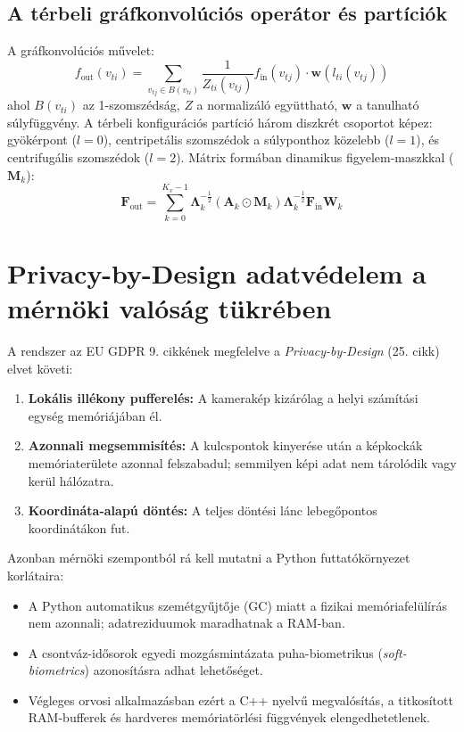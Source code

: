 \documentclass[12pt,a4paper,oneside]{report}
\begin{document}
\subsection{A térbeli gráfkonvolúciós operátor és partíciók}
A gráfkonvolúciós művelet:
\begin{equation}
    f_{\text{out}}(v_{ti}) = \sum_{v_{tj} \in B(v_{ti})} \frac{1}{Z_{ti}(v_{tj})} f_{\text{in}}(v_{tj}) \cdot \mathbf{w}\left(l_{ti}(v_{tj})\right)
\end{equation}
ahol $B(v_{ti})$ az 1-szomszédság, $Z$ a normalizáló együttható, $\mathbf{w}$ a tanulható súlyfüggvény. A térbeli konfigurációs partíció három diszkrét csoportot képez: gyökérpont ($l=0$), centripetális szomszédok a súlyponthoz közelebb ($l=1$), és centrifugális szomszédok ($l=2$). Mátrix formában dinamikus figyelem-maszkkal ($\mathbf{M}_k$):
\begin{equation}
    \mathbf{F}_{\text{out}} = \sum_{k=0}^{K_v - 1} \mathbf{\Lambda}_k^{-\frac{1}{2}} \left( \mathbf{A}_k \odot \mathbf{M}_k \right) \mathbf{\Lambda}_k^{-\frac{1}{2}} \mathbf{F}_{\text{in}} \mathbf{W}_k
\end{equation}

\section{Privacy-by-Design adatvédelem a mérnöki valóság tükrében}
A rendszer az EU GDPR 9. cikkének \cite{gdpr2016} megfelelve a \textit{Privacy-by-Design} (25. cikk) elvet követi:
\begin{enumerate}
    \item \textbf{Lokális illékony pufferelés:} A kamerakép kizárólag a helyi számítási egység memóriájában él.
    \item \textbf{Azonnali megsemmisítés:} A kulcspontok kinyerése után a képkockák memóriaterülete azonnal felszabadul; semmilyen képi adat nem tárolódik vagy kerül hálózatra.
    \item \textbf{Koordináta-alapú döntés:} A teljes döntési lánc lebegőpontos koordinátákon fut.
\end{enumerate}

Azonban mérnöki szempontból rá kell mutatni a Python futtatókörnyezet korlátaira:
\begin{itemize}
    \item A Python automatikus szemétgyűjtője (GC) miatt a fizikai memóriafelülírás nem azonnali; adatreziduumok maradhatnak a RAM-ban.
    \item A csontváz-idősorok egyedi mozgásmintázata puha-biometrikus (\textit{soft-biometrics}) azonosításra adhat lehetőséget.
    \item Végleges orvosi alkalmazásban ezért a C++ nyelvű megvalósítás, a titkosított RAM-bufferek és hardveres memóriatörlési függvények elengedhetetlenek.
\end{itemize}
\end{document}
